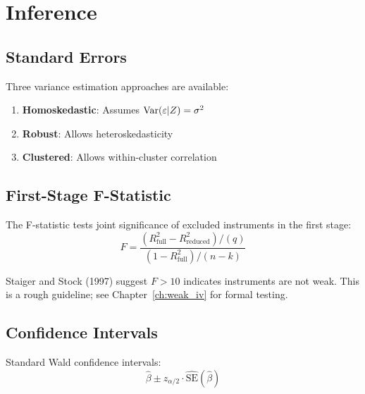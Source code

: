 \section{Inference}
\label{sec:iv_inference}

\subsection{Standard Errors}

Three variance estimation approaches are available:

\begin{enumerate}
    \item \textbf{Homoskedastic}: Assumes $\mathrm{Var}(\varepsilon | Z) = \sigma^2$
    \item \textbf{Robust}: Allows heteroskedasticity
    \item \textbf{Clustered}: Allows within-cluster correlation
\end{enumerate}

\subsection{First-Stage F-Statistic}

\begin{definition}
\label{def:first_stage_f}
The F-statistic tests joint significance of excluded instruments in the first stage:
\begin{equation}
F = \frac{(R^2_{\text{full}} - R^2_{\text{reduced}})/(q)}{(1 - R^2_{\text{full}})/(n - k)}
\end{equation}
\end{definition}

\begin{remark}
Staiger and Stock (1997) suggest $F > 10$ indicates instruments are not weak. This is a rough guideline; see Chapter~\ref{ch:weak_iv} for formal testing.
\end{remark}

\subsection{Confidence Intervals}

Standard Wald confidence intervals:
\begin{equation}
\hat{\beta} \pm z_{\alpha/2} \cdot \hat{\text{SE}}(\hat{\beta})
\end{equation}

